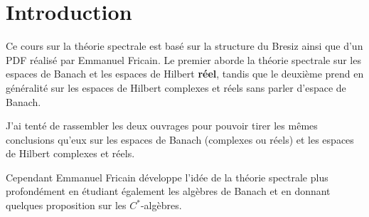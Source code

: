 \section{Introduction}

Ce cours sur la théorie spectrale est basé sur la structure du Bresiz ainsi que
d'un PDF réalisé par Emmanuel Fricain.
Le premier aborde la théorie spectrale sur les espaces de Banach et les
espaces de Hilbert \textbf{réel}, tandis que le deuxième prend en généralité sur
les espaces de Hilbert complexes et réels sans parler d'espace de Banach.

J'ai tenté de rassembler les deux ouvrages pour pouvoir tirer les mêmes
conclusions qu'eux sur les espaces de Banach (complexes ou réels) et les espaces
de Hilbert complexes et réels.

Cependant Emmanuel Fricain développe l'idée de la théorie spectrale plus
profondément en étudiant également les algèbres de Banach et en donnant quelques
proposition sur les $C^{*}$-algèbres.

